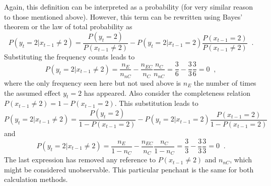 \documentclass[a4paper,11pt]{article}
\begin{document}
Again, this definition can be interpreted as a probability (for very similar reason to those mentioned above).  However, this term can be rewritten using Bayes' theorem or the law of total probability as
$$
P\left( y_t = 2 | x_{t-1} \neq 2\right) = \frac{P\left( y_t = 2 \right)}{P\left( x_{t-1} \neq 2 \right)} - P\left( y_t = 2 | x_{t-1} = 2\right)\frac{P\left( x_{t-1} = 2 \right)}{P\left( x_{t-1} \neq 2 \right)}\;\;.
$$
Substituting the frequency counts leads to
$$
P\left( y_t = 2 | x_{t-1} \neq 2\right) = \frac{n_E}{n_{nC}} - \frac{n_{EC}}{n_C}\frac{n_C}{n_{nC}} = \frac{3}{6} - \frac{3}{3}\frac{3}{6} = 0\;\;,
$$
where the only frequency seen here but not used above is $n_E$ the number of times the assumed effect $y_t=2$ has appeared.  Also consider the completeness relation $P\left( x_{t-1} \neq 2 \right) = 1 - P\left( x_{t-1} = 2 \right)$.  This substitution leads to
$$
P\left( y_t = 2 | x_{t-1} \neq 2\right) = \frac{P\left( y_t = 2 \right)}{1-P\left( x_{t-1} = 2 \right)} - P\left( y_t = 2 | x_{t-1} = 2\right)\frac{P\left( x_{t-1} = 2 \right)}{1-P\left( x_{t-1} = 2 \right)}
$$
and
$$
P\left( y_t = 2 | x_{t-1} \neq 2\right) = \frac{n_E}{1-n_{C}} - \frac{n_{EC}}{n_C}\frac{n_C}{1-n_{C}} = \frac{3}{3} - \frac{3}{3}\frac{3}{3} = 0\;\;.
$$
The last expression has removed any reference to $P\left( x_{t-1} \neq 2 \right)$ and $n_{nC}$, which might be considered unobservable.  This particular penchant is the same for both calculation methods.
\end{document}
